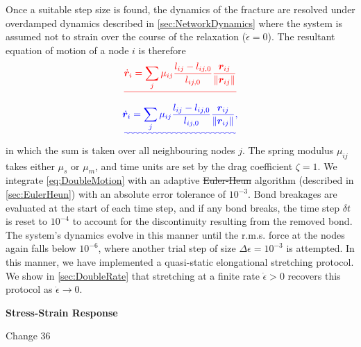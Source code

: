 \documentclass[asymmetricmargins]{library/duthesis}%
\newcommand{\DiffReportBodyFont}{\small}
\newcommand{\DiffReportLocationFont}{\large\bfseries}
\newcommand{\DiffReportMetaFont}{\small\ttfamily}
\newcommand{\DiffReportLocation}[1]{%
  \Needspace{4\baselineskip}%
  \par\medskip
  {\DiffReportLocationFont #1\par}
}
\newcommand{\DiffReportChange}[1]{%
  \Needspace{4\baselineskip}%
  \par\smallskip
  {\DiffReportMetaFont Change #1\par}
  \smallskip
}
\newenvironment{DiffReportContent}
  {\begingroup\DiffReportBodyFont}
  {\par\endgroup\medskip}
\providecommand{\DIFadd}[1]{{\protect\color{blue}\uwave{#1}}} %
\providecommand{\DIFdel}[1]{{\protect\color{red}\sout{#1}}}                      %
\providecommand{\DIFaddbegin}{} %
\providecommand{\DIFaddend}{} %
\providecommand{\DIFdelbegin}{} %
\providecommand{\DIFdelend}{} %
\begin{document}
\begin{DiffReportContent}
Once a suitable step size is found, the dynamics of the fracture are resolved under overdamped dynamics described in \cref{sec:NetworkDynamics} where the system is assumed not to strain over the course of the relaxation ($\dot{\epsilon}=0$). The resultant equation of motion of a node $i$ is therefore 
\DIFdelbegin \begin{displaymath}
    \DIFdel{\dot{\bm{r}}_i = \sum_{j}\mu_{ij} \frac{l_{ij}-l_{ij,0}}{l_{ij,0}}\frac{\bm{r}_{ij}}{\left\lVert \bm{r}_{ij} \right\rVert}
}\end{displaymath}%
\DIFdelend \DIFaddbegin \begin{equation}
    \DIFadd{\dot{\bm{r}}_i = \sum_{j}\mu_{ij} \frac{l_{ij}-l_{ij,0}}{l_{ij,0}}\frac{\bm{r}_{ij}}{\left\lVert \bm{r}_{ij} \right\rVert},
    \relax
}\end{equation}\DIFaddend 
in which the sum is taken over all neighbouring nodes $j$. The spring modulus $\mu_{ij}$ takes either $\mu_s$ or $\mu_m$, and time units are set by the drag coefficient $\zeta=1$. We integrate \cref{eq:DoubleMotion} with an adaptive \DIFdelbegin \DIFdel{Euler-Heun }\DIFdelend \DIFaddbegin \DIFadd{Euler--Heun }\DIFaddend algorithm (described in \cref{sec:EulerHeun}) with an absolute error tolerance of $10^{-3}$. Bond breakages are evaluated at the start of each time step, and if any bond breaks, the time step $\delta t$ is reset to $10^{-4}$ to account for the discontinuity resulting from the removed bond. The system's dynamics evolve in this manner until the r.m.s. force at the nodes again falls below $10^{-6}$, where another trial step of size $\Delta\epsilon=10^{-3}$ is attempted. In this manner, we have implemented a quasi-static elongational stretching protocol. We show in \cref{sec:DoubleRate} that stretching at a finite rate $\dot{\epsilon} > 0$ recovers this protocol as $\dot{\epsilon} \to 0$.
\end{DiffReportContent}
\DiffReportLocation{Stress-Strain Response}
\DiffReportChange{36}
\end{document}
